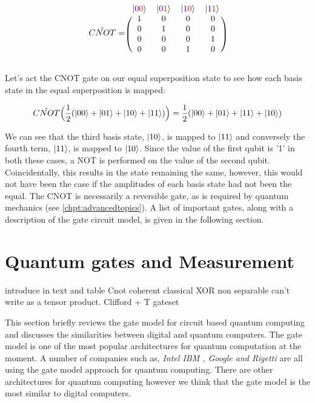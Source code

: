\begin{equation}\label{CNOT}
\hat{CNOT}=
\begin{blockarray}{cccc}
    \ket{\textcolor{blue}{0}\textcolor{red}{0}} & \ket{\textcolor{blue}{0}\textcolor{red}{1}} & \ket{\textcolor{blue}{1}\textcolor{red}{0}} & \ket{\textcolor{blue}{1}\textcolor{red}{1}} \\
    \begin{block}{(cccc)}
        1 & 0 & 0 & 0\\
        0 & 1 & 0 & 0\\
        0 & 0 & 0 & 1\\
        0 & 0 & 1 & 0\\
    \end{block}
\end{blockarray}
\end{equation}

Let's act the CNOT gate on our equal superposition state to see how each basis state in the equal superposition is mapped:

\begin{equation}
    \hat{CNOT}\Big(\frac{1}{2}(\left\vert{00}\right\rangle+\left\vert{01}\right\rangle+\left\vert{10}\right\rangle+\left\vert{11}\right\rangle)\Big)=\frac{1}{2}(\left\vert{00}\right\rangle+\left\vert{01}\right\rangle+\left\vert{11}\right\rangle+\left\vert{10}\right\rangle)
\end{equation}

We can see that the third basis state, $\left\vert{10}\right\rangle$, is mapped to $\left\vert{11}\right\rangle$ and conversely the fourth term, $\left\vert{11}\right\rangle$, is mapped to $\left\vert{10}\right\rangle$. Since the value of the first qubit is '1' in both these cases, a NOT is performed on the value of the second qubit. Coincidentally, this results in the state remaining the same, however, this would not have been the case if the amplitudes of each basis state had not been the equal. The CNOT is necessarily a reversible gate, as is required by quantum mechanics (see \autoref{chpt:advancedtopics}). A list of important gates, along with a description of the gate circuit model, is given in the following section.

\section{Quantum gates and Measurement}

introduce in text and table
Cnot coherent classical XOR non separable can't write as a tensor product.
Clifford + T gateset 

This section briefly reviews the gate model for circuit based quantum computing and discusses the similarities between  digital and quantum computers. The gate model is one of the most popular architectures for quantum computation at the moment. A number of companies such as, \textit{Intel \cite{intelqcomp} IBM \cite{ibmqweb}, Google \cite{googleqai} and Rigetti \cite{rigetti}} are all using the gate model approach for quantum computing. There are other architectures for quantum computing however we think that the gate model is the most similar to digital computers.

